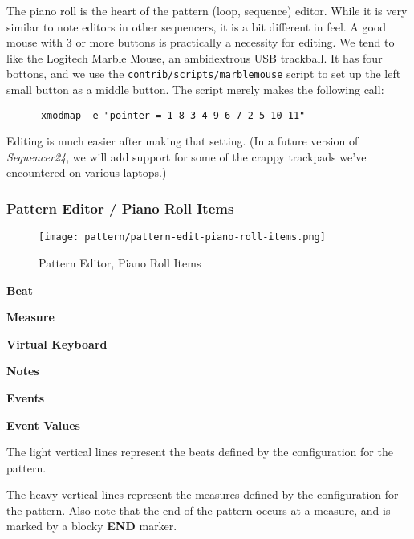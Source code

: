    The piano roll is the heart of the pattern (loop, sequence) editor.
   While it is very similar to note editors in other sequencers, it is a bit
   different in feel.  A good mouse with 3 or more buttons is practically a
   necessity for editing.  We tend to like the Logitech Marble Mouse, an
   ambidextrous USB trackball.  It has four bottons, and we use the
   \texttt{contrib/scripts/marblemouse} script to set up the left small
   button as a middle button.  The script merely makes the following call:

   \begin{verbatim}
      xmodmap -e "pointer = 1 8 3 4 9 6 7 2 5 10 11"
   \end{verbatim}

   Editing is much easier after making that setting.  (In a future
   version of \textsl{Sequencer24}, we will add support for some of the
   crappy trackpads we've encountered on various laptops.)

\subsubsection{Pattern Editor / Piano Roll Items}
\label{subsubsec:seq24_pattern_editor_piano_roll_items}

\begin{figure}[H]
   \centering 
   \texttt{[image: pattern/pattern-edit-piano-roll-items.png]}
   \caption{Pattern Editor, Piano Roll Items}
   \label{fig:pattern_editor_piano_roll_items}
\end{figure}

   \begin{enumber}
      \item \textbf{Beat}
      \item \textbf{Measure}
      \item \textbf{Virtual Keyboard}
      \item \textbf{Notes}
      \item \textbf{Events}
      \item \textbf{Event Values}
   \end{enumber}

   \setcounter{ItemCounter}{0}      %

   The light vertical lines represent the beats defined by the configuration
   for the pattern.

   The heavy vertical lines represent the measures defined by the
   configuration for the pattern.
   Also note that the end of the pattern
   occurs at a measure, and is marked by a blocky \textbf{END} marker.

